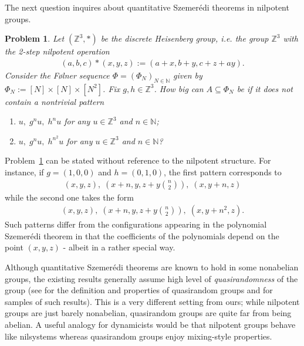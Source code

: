 \documentclass[11pt]{amsart}
\newtheorem{problem}{Problem}
\theoremstyle{definition}
\newcommand{\N}{{\mathbb N}}
\newcommand{\Z}{{\mathbb Z}}
\newcommand{\1}{{\mathbf{1}}}
\begin{document}
The next question inquires about quantitative Szemer\'edi theorems in nilpotent groups.
\begin{problem}\label{Pr: quantitative nilpotent Szemeredi}
    Let $(\Z^3, *)$ be the discrete Heisenberg group, i.e. the group $\Z^3$ with the 2-step nilpotent operation
    \begin{align*}
        (a,b,c)*(x,y,z) := (a+x, b+y, c + z + ay).
    \end{align*}
    Consider the F{\o}lner sequence $\Phi=(\Phi_N)_{N\in\N}$ given by $\Phi_N:= [N]\times[N]\times[N^2]$.
    Fix $g,h\in \Z^3$. How big can $A\subseteq \Phi_N$ be if it does not contain a nontrivial pattern
    \begin{enumerate}
        \item $u,\; g^nu,\; h^{n}u$ for any $u\in \Z^3$ and $n\in\N$;
        \item $u,\; g^nu,\; h^{n^2}u$ for any $u\in \Z^3$ and $n\in\N$?
    \end{enumerate}
\end{problem}
Problem~\ref{Pr: quantitative nilpotent Szemeredi} can be stated without reference to the nilpotent structure. For instance, if $g = (1,0,0)$ and $h=(0,1,0)$, the first pattern corresponds to 
\begin{align}\label{E: nilpotent config 1}
(x,y,z),\; (x + n, y, z+ y\binom{n}{2}),\; (x, y + n, z)    
\end{align}
while the second one takes the form
\begin{align}\label{E: nilpotent config 2}
(x,y,z),\; (x + n, y, z +y\binom{n}{2}),\; (x, y + n^2, z).  
\end{align}
Such patterns differ from the configurations appearing in the polynomial Szemer\'edi theorem in that the coefficients of the polynomials depend on the point $(x,y,z)$ - albeit in a rather special way.


Although quantitative Szemer\'edi theorems are known to hold in some nonabelian groups, the existing results generally assume high level of \textit{quasirandomness} of the group (see \cite{Go08} for the definition and properties of quasirandom groups and \cite{A16, Pel18b, Tao13} for samples of such results). This is a very different setting from ours; while nilpotent groups are just barely nonabelian, quasirandom groups are quite far from being abelian. A useful analogy for dynamicists would be that nilpotent groups behave like nilsystems whereas quasirandom groups enjoy mixing-style properties. 
\end{document}
